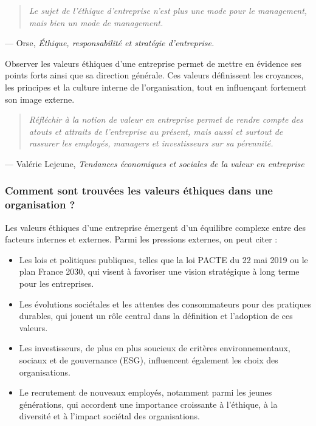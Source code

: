 \documentclass[12pt,a4paper]{report}
\begin{document}
\begin{quote}
    \textit{Le sujet de l'éthique d'entreprise n'est plus une mode pour le management, mais bien un mode de management.}
\end{quote}
\hfill --- Orse, \textit{Éthique, responsabilité et stratégie d'entreprise.}

Observer les valeurs éthiques d'une entreprise permet de mettre en évidence ses points forts ainsi que sa direction générale. Ces valeurs définissent les croyances, les principes et la culture interne de l'organisation, tout en influençant fortement son image externe.

\begin{quote}
    \textit{Réfléchir à la notion de valeur en entreprise permet de rendre compte des atouts et attraits de l'entreprise au présent, mais aussi et surtout de rassurer les employés, managers et investisseurs sur sa pérennité.}
\end{quote}
\hfill --- Valérie Lejeune, \textit{Tendances économiques et sociales de la valeur en entreprise}

\subsubsection{Comment sont trouvées les valeurs éthiques dans une organisation ?}
Les valeurs éthiques d'une entreprise émergent d'un équilibre complexe entre des facteurs internes et externes. Parmi les pressions externes, on peut citer :
\begin{itemize}
    \item Les lois et politiques publiques, telles que la loi PACTE du 22 mai 2019 ou le plan France 2030, qui visent à favoriser une vision stratégique à long terme pour les entreprises.\\
    \item Les évolutions sociétales et les attentes des consommateurs pour des pratiques durables, qui jouent un rôle central dans la définition et l'adoption de ces valeurs.\\
    \item Les investisseurs, de plus en plus soucieux de critères environnementaux, sociaux et de gouvernance (ESG), influencent également les choix des organisations.\\
    \item Le recrutement de nouveaux employés, notamment parmi les jeunes générations, qui accordent une importance croissante à l'éthique, à la diversité et à l'impact sociétal des organisations.\\
\end{itemize}
\end{document}
